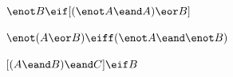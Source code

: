 \begin{compactlist}
\item $\enot B \eif [(\enot A \eand A) \eor B]$\vspace{.5ex} 

%

\item $\enot(A \eor B) \eiff (\enot A \eand \enot B)$ \vspace{.5ex}

%

\item $[(A \eand B) \eand C] \eif B$\vspace{.5ex}							
%
%
%


\end{compactlist}
